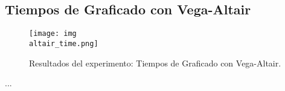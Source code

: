 \subsection{Tiempos de Graficado con Vega-Altair}
\label{exp:altair-time}

\begin{figure}[H]
    \centering
    \texttt{[image: img\\altair\_time.png]}
    \caption{Resultados del experimento: Tiempos de Graficado con Vega-Altair.}
    \label{fig:altair-time}
\end{figure}

...
